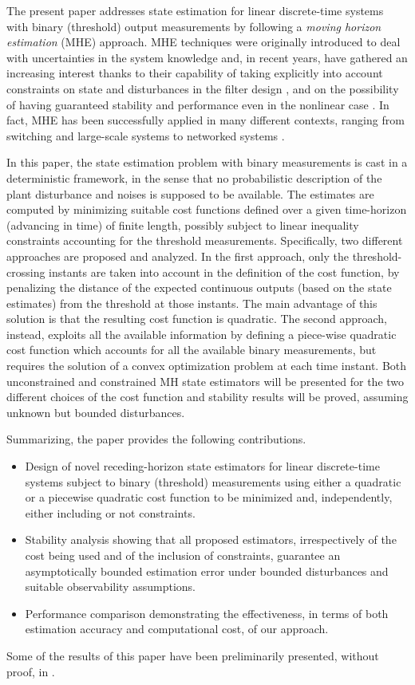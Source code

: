 \documentclass[11pt,journal,onecolumn]{IEEEtran}
\begin{document}
The present paper addresses state estimation for linear discrete-time systems with binary (threshold) output measurements by following a \textit{moving horizon estimation} (MHE) approach. MHE techniques were originally introduced to deal with uncertainties in the system knowledge \cite{Jazwinski} and, in recent years, have gathered an increasing interest thanks to their capability of taking explicitly into account constraints on state and disturbances in the filter design \cite{RaoRawLee01}, and on the possibility of having guaranteed stability and performance even in the nonlinear case \cite{RaRaMa03,NLMHE,AlBaBaZavCDC10}. In fact, MHE has been successfully applied in many different contexts, ranging from switching and large-scale systems \cite{AlBaBaTAC05,GuoHuang13,FaFerrSca10,HabVerh13,SchnHannMarq15} to networked systems \cite{Farina1,Farina2,quantized_measurement}.

In this paper, the state estimation problem with binary measurements is cast in a deterministic framework, in the sense that no probabilistic description of the plant disturbance and noises is supposed to be available. The estimates are computed by minimizing suitable cost functions defined over a given time-horizon (advancing in time) of finite length, possibly subject to linear inequality constraints accounting for the threshold measurements. Specifically, two different approaches are proposed and analyzed. In the first approach, only the threshold-crossing instants are taken into account in the definition of the cost function, by penalizing the distance of the expected continuous outputs (based on the state estimates) from the threshold at those instants. The main advantage of this solution is that the resulting cost function is quadratic. The second approach, instead, exploits all the available information by defining a piece-wise quadratic cost function which accounts for all the available binary measurements, but requires the solution of a convex optimization problem at each time instant. Both unconstrained and constrained MH state estimators will be presented for the two different choices of the cost function and stability results will be proved, assuming unknown but bounded disturbances.

Summarizing, the paper provides the following contributions.
\begin{itemize}
\item Design of novel receding-horizon state estimators for linear discrete-time systems subject to binary (threshold) measurements using either a quadratic or a piecewise quadratic cost function to be minimized and, independently, either including or not constraints.
\item Stability analysis showing that all proposed estimators, irrespectively of the cost being used and of the inclusion of constraints, guarantee an asymptotically bounded estimation error under bounded disturbances and suitable observability assumptions.
\item Performance comparison demonstrating the effectiveness, in terms of both estimation accuracy and computational cost, of our approach.
\end{itemize}
Some of the results of this paper have been preliminarily presented, without proof, in \cite{CDC15}.
\end{document}
